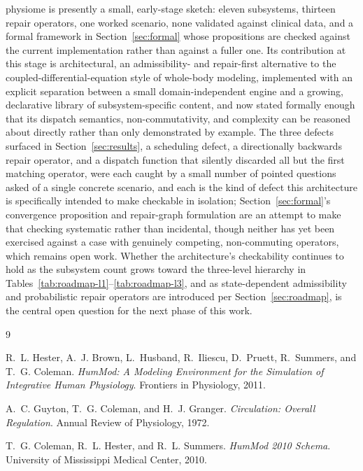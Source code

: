 \documentclass[11pt]{article}
\begin{document}
physiome is presently a small, early-stage sketch: eleven subsystems, thirteen repair operators, one worked scenario, none validated against clinical data, and a formal framework in Section~\ref{sec:formal} whose propositions are checked against the current implementation rather than against a fuller one. Its contribution at this stage is architectural, an admissibility- and repair-first alternative to the coupled-differential-equation style of whole-body modeling, implemented with an explicit separation between a small domain-independent engine and a growing, declarative library of subsystem-specific content, and now stated formally enough that its dispatch semantics, non-commutativity, and complexity can be reasoned about directly rather than only demonstrated by example. The three defects surfaced in Section~\ref{sec:results}, a scheduling defect, a directionally backwards repair operator, and a dispatch function that silently discarded all but the first matching operator, were each caught by a small number of pointed questions asked of a single concrete scenario, and each is the kind of defect this architecture is specifically intended to make checkable in isolation; Section~\ref{sec:formal}'s convergence proposition and repair-graph formulation are an attempt to make that checking systematic rather than incidental, though neither has yet been exercised against a case with genuinely competing, non-commuting operators, which remains open work. Whether the architecture's checkability continues to hold as the subsystem count grows toward the three-level hierarchy in Tables~\ref{tab:roadmap-l1}--\ref{tab:roadmap-l3}, and as state-dependent admissibility and probabilistic repair operators are introduced per Section~\ref{sec:roadmap}, is the central open question for the next phase of this work.

\begin{thebibliography}{9}

R.~L. Hester, A.~J. Brown, L.~Husband, R.~Iliescu, D.~Pruett, R.~Summers, and T.~G. Coleman.
\textit{HumMod: A Modeling Environment for the Simulation of Integrative Human Physiology}.
Frontiers in Physiology, 2011.

A.~C. Guyton, T.~G. Coleman, and H.~J. Granger.
\textit{Circulation: Overall Regulation}.
Annual Review of Physiology, 1972.

T.~G. Coleman, R.~L. Hester, and R.~L. Summers.
\textit{HumMod 2010 Schema}.
University of Mississippi Medical Center, 2010.

\end{thebibliography}
\end{document}
